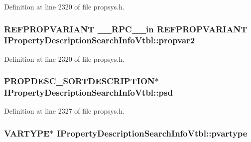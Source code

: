Definition at line 2320 of file propsys.\+h.

\subsubsection[{\texorpdfstring{propvar2}{propvar2}}]{ {\bf R\+E\+F\+P\+R\+O\+P\+V\+A\+R\+I\+A\+NT} {\bf \+\_\+\+\_\+\+R\+P\+C\+\_\+\+\_\+in} {\bf R\+E\+F\+P\+R\+O\+P\+V\+A\+R\+I\+A\+NT} I\+Property\+Description\+Search\+Info\+Vtbl\+::propvar2}\hypertarget{struct_i_property_description_search_info_vtbl_a255c7bdf2b6da23e4d51c4837a54e012}{}\label{struct_i_property_description_search_info_vtbl_a255c7bdf2b6da23e4d51c4837a54e012}


Definition at line 2320 of file propsys.\+h.

\subsubsection[{\texorpdfstring{psd}{psd}}]{ {\bf P\+R\+O\+P\+D\+E\+S\+C\+\_\+\+S\+O\+R\+T\+D\+E\+S\+C\+R\+I\+P\+T\+I\+ON}$\ast$ I\+Property\+Description\+Search\+Info\+Vtbl\+::psd}\hypertarget{struct_i_property_description_search_info_vtbl_a12fc279aae54ad7554729f6b1b8cdf83}{}\label{struct_i_property_description_search_info_vtbl_a12fc279aae54ad7554729f6b1b8cdf83}


Definition at line 2327 of file propsys.\+h.

\subsubsection[{\texorpdfstring{pvartype}{pvartype}}]{ V\+A\+R\+T\+Y\+PE$\ast$ I\+Property\+Description\+Search\+Info\+Vtbl\+::pvartype}\hypertarget{struct_i_property_description_search_info_vtbl_a13b29b4b1abb859246095ca05fb2062a}{}\label{struct_i_property_description_search_info_vtbl_a13b29b4b1abb859246095ca05fb2062a}



